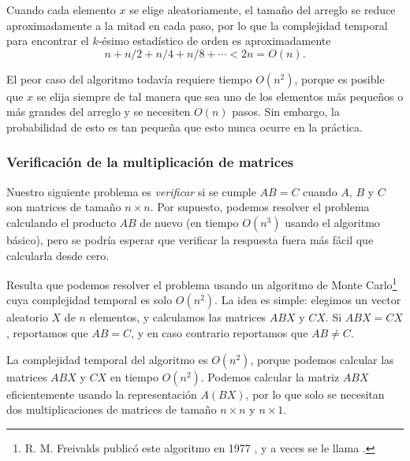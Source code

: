 Cuando cada elemento $x$ se elige aleatoriamente,
el tamaño del arreglo se reduce aproximadamente a la mitad en cada paso,
por lo que la complejidad temporal para
encontrar el $k$-ésimo estadístico de orden es aproximadamente
\[n+n/2+n/4+n/8+\cdots < 2n = O(n).\]

El peor caso del algoritmo todavía requiere tiempo $O(n^2)$,
porque es posible que $x$ se elija siempre
de tal manera que sea uno de los elementos más pequeños o más grandes
del arreglo y se necesiten $O(n)$ pasos.
Sin embargo, la probabilidad de esto es tan pequeña
que esto nunca ocurre en la práctica.

\subsubsection{Verificación de la multiplicación de matrices}


Nuestro siguiente problema es \emph{verificar}
si se cumple $AB=C$ cuando $A$, $B$ y $C$
son matrices de tamaño $n \times n$.
Por supuesto, podemos resolver el problema
calculando el producto $AB$ de nuevo
(en tiempo $O(n^3)$ usando el algoritmo básico),
pero se podría esperar que verificar la
respuesta fuera más fácil que calcularla desde cero.

Resulta que podemos resolver el problema
usando un algoritmo de Monte Carlo\footnote{R. M. Freivalds publicó
este algoritmo en 1977 \cite{fre77}, y a veces
se le llama  .} cuya
complejidad temporal es solo $O(n^2)$.
La idea es simple: elegimos un vector aleatorio
$X$ de $n$ elementos, y calculamos las matrices
$ABX$ y $CX$. Si $ABX=CX$, reportamos que $AB=C$,
y en caso contrario reportamos que $AB \neq C$.

La complejidad temporal del algoritmo es
$O(n^2)$, porque podemos calcular las matrices
$ABX$ y $CX$ en tiempo $O(n^2)$.
Podemos calcular la matriz $ABX$ eficientemente
usando la representación $A(BX)$, por lo que solo se necesitan dos
multiplicaciones de matrices de tamaño $n \times n$ y $n \times 1$.

